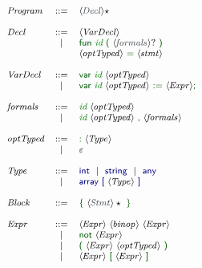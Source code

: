 \begin{figure}[H]
    \hspace*{-1cm}
    \begin{minipage}{0.5\textwidth}
        \[\footnotesize
        \begin{array}[t]{lcl@{\hspace{0.4cm}}}
          \nta{Program} & \Prod & \ntstar{Decl} \\
          \\
          \nta{Decl} & \Prod & \nt{VarDecl}\ \\
                       & \VB & \vterminal{fun}\ \terminal{id}\ \vterminal{(}\ \ntq{formals}\ \vterminal{)}\\ 
                       &&  \nt{optTyped}\ \vterminal{=}\ \nt{stmt} \\
          \\
          \nta{VarDecl} & \Prod & \vterminal{var}\ \terminal{id}\ \nt{optTyped} \\
                        & \VB   & \vterminal{var}\ \terminal{id}\ \nt{optTyped}\ \vterminal{:=}\ \nt{Expr} \vterminal{;}\\
          \\
          \nta{formals} & \Prod & \terminal{id}\ \nt{optTyped} \\
                        & \VB & \terminal{id}\ \nt{optTyped}\ \vterminal{,}\ \nt{formals}\\
                      \\
          \nta{optTyped} & \Prod & \vterminal{:}\ \nt{Type}\\
                        & \VB{} & \varepsilon \\
          \\
          \nta{Type} & \Prod & \Cty{int}\ \VB\ \Cty{string}\ \VB\ \Cty{any} \\
                     & \VB   & \Cty{array}\ \Cty{[}\ \nt{Type}\ \Cty{]} \\
          \\
          \nta{Block} & \Prod & \vterminal{\{}\ \ntstar{Stmt}\ \vterminal{\}} \\
          \\
          \nta{Expr} & \Prod & \nt{Expr}\ \nt{binop}\ \nt{Expr} \\
                     & \VB   & \vterminal{not}\ \nt{Expr} \\
                     & \VB   & \vterminal{(}\ \nt{Expr}\ \nt{optTyped}\ \vterminal{)} \\
                     & \VB   & \nt{Expr}\ \vterminal{[}\ \nt{Expr}\ \vterminal{]} \\

\end{array}\]
\end{minipage}
\end{figure}
